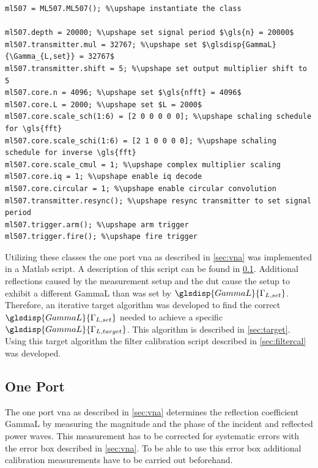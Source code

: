 \documentclass[12pt,a4paper,parskip=full,abstract=true,BCOR=12mm,twoside,open=right]{scrreprt}
\newcommand{\hack}{}
\begin{document}
\begin{lstlisting}[float=htb,caption={Example usage of the Matlab driver for the hardware},label=src:mdriver,basicstyle=\hack\scriptsize,texcl=true]
ml507 = ML507.ML507(); %\upshape instantiate the class

ml507.depth = 20000; %\upshape set signal period $\gls{n} = 20000$
ml507.transmitter.mul = 32767; %\upshape set $\glsdisp{GammaL}{\Gamma_{L,set}} = 32767$
ml507.transmitter.shift = 5; %\upshape set output multiplier shift to 5
ml507.core.n = 4096; %\upshape set $\gls{nfft} = 4096$
ml507.core.L = 2000; %\upshape set $L = 2000$
ml507.core.scale_sch(1:6) = [2 0 0 0 0 0]; %\upshape schaling schedule for \gls{fft}
ml507.core.scale_schi(1:6) = [2 1 0 0 0 0]; %\upshape schaling schedule for inverse \gls{fft}
ml507.core.scale_cmul = 1; %\upshape complex multiplier scaling
ml507.core.iq = 1; %\upshape enable iq decode
ml507.core.circular = 1; %\upshape enable circular convolution
ml507.transmitter.resync(); %\upshape resync transmitter to set signal period
ml507.trigger.arm(); %\upshape arm trigger
ml507.trigger.fire(); %\upshape fire trigger
\end{lstlisting}

Utilizing these classes the one port \gls{vna} as described in \cref{sec:vna}
was implemented in a Matlab script. A description of this script can be found
in \cref{sec:mvna}. Additional reflections caused by the measurement setup and the \gls{dut} cause
the setup to exhibit a different \gls{GammaL} than was set by
$\glsdisp{GammaL}{\Gamma_{L,set}}$. Therefore, an iterative target algorithm
was developed to find the correct $\glsdisp{GammaL}{\Gamma_{L,set}}$ needed
to achieve a specific $\glsdisp{GammaL}{\Gamma_{L,target}}$. This algorithm
is described in \cref{sec:target}. Using this target algorithm the
filter calibration script described in \cref{sec:filtercal} was developed.


\subsection{One Port }
\label{sec:mvna}

The one port \gls{vna} as described in \cref{sec:vna} determines the reflection
coefficient \gls{GammaL} by measuring the magnitude and the phase of the incident
and reflected power waves. This measurement has to be corrected for systematic
errors with the error box described in \cref{sec:vna}. To be able to use
this error box additional calibration measurements have to be carried out
beforehand.
\end{document}
